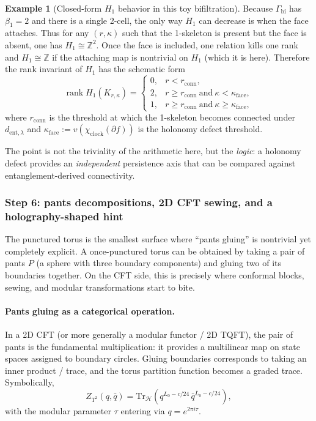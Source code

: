 \documentclass[11pt,oneside]{amsbook}
\numberwithin{equation}{section}
\theoremstyle{plain}
\theoremstyle{definition}
\newtheorem{example}[theorem]{Example}
\theoremstyle{remark}
\newcommand{\Z}{\mathbb{Z}}
\DeclareMathOperator{\rank}{\mathrm{rank}}
\newcommand{\cH}{\mathcal{H}}
\begin{document}
\begin{example}[Closed-form $H_1$ behavior in this toy bifiltration]
Because $\Gamma_{\mathrm{bi}}$ has $\beta_1=2$ and there is a single 2-cell, the only way $H_1$ can decrease is when the face attaches.
Thus for any $(r,\kappa)$ such that the 1-skeleton is present but the face is absent, one has $H_1\cong \Z^2$.
Once the face is included, one relation kills one rank and $H_1\cong \Z$ if the attaching map is nontrivial on $H_1$ (which it is here).
Therefore the rank invariant of $H_1$ has the schematic form
\[
\rank H_1(K_{r,\kappa})=
\begin{cases}
0,& r<r_{\mathrm{conn}},\\
2,& r\ge r_{\mathrm{conn}}\ \text{and}\ \kappa<\kappa_{\mathrm{face}},\\
1,& r\ge r_{\mathrm{conn}}\ \text{and}\ \kappa\ge \kappa_{\mathrm{face}},
\end{cases}
\]
where $r_{\mathrm{conn}}$ is the threshold at which the 1-skeleton becomes connected under $d_{\mathrm{ent},\lambda}$ and $\kappa_{\mathrm{face}}:=v(\chi_{\mathrm{clock}}(\partial f))$ is the holonomy defect threshold.

The point is not the triviality of the arithmetic here, but the \emph{logic}:
a holonomy defect provides an \emph{independent} persistence axis that can be compared against entanglement-derived connectivity.
\end{example}

\subsubsection{Step 6: pants decompositions, 2D CFT sewing, and a holography-shaped hint}

The punctured torus is the smallest surface where ``pants gluing'' is nontrivial yet completely explicit.
A once-punctured torus can be obtained by taking a pair of pants $P$ (a sphere with three boundary components) and gluing two of its boundaries together.
On the CFT side, this is precisely where conformal blocks, sewing, and modular transformations start to bite.

\paragraph{Pants gluing as a categorical operation.}
In a 2D CFT (or more generally a modular functor / 2D TQFT), the pair of pants is the fundamental multiplication:
it provides a multilinear map on state spaces assigned to boundary circles.
Gluing boundaries corresponds to taking an inner product / trace, and the torus partition function becomes a graded trace.
Symbolically,
\[
Z_{T^2}(q,\bar q)=\mathrm{Tr}_{\cH}\!\left(q^{L_0-c/24}\,\bar q^{\bar L_0-c/24}\right),
\]
with the modular parameter $\tau$ entering via $q=e^{2\pi i\tau}$.
\end{document}
